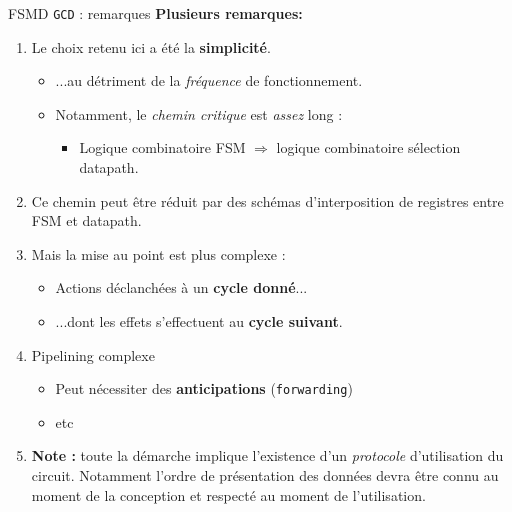 \begin{frame}{FSMD \texttt{GCD} : remarques}
  \textbf{Plusieurs remarques:}
  \begin{enumerate}
    \item Le choix retenu ici a été la \textbf{simplicité}.
    \begin{itemize}
      \item ...au détriment de la \textit{fréquence} de fonctionnement.
      \item Notamment, le \textit{chemin critique} est \textit{assez} long :
        \begin{itemize}
          \item Logique combinatoire FSM $\Rightarrow$ logique combinatoire sélection datapath.
        \end{itemize}
    \end{itemize}
   \item Ce chemin peut être réduit par des schémas d'interposition de registres entre FSM et datapath.
   \item Mais la mise au point est plus complexe :
     \begin{itemize}
      \item Actions déclanchées à un \textbf{cycle donné}...
      \item ...dont les effets s'effectuent au \textbf{cycle suivant}.
    \end{itemize}
    \item Pipelining complexe
    \begin{itemize}
      \item Peut nécessiter des \textbf{anticipations} (\texttt{forwarding})
      \item etc
    \end{itemize}
    \item \textbf{Note :} toute la démarche implique l'existence d'un \textit{protocole} d'utilisation du circuit. Notamment l'ordre de présentation des données devra être connu au moment de la conception et respecté au moment de l'utilisation.
  \end{enumerate}
\end{frame}
